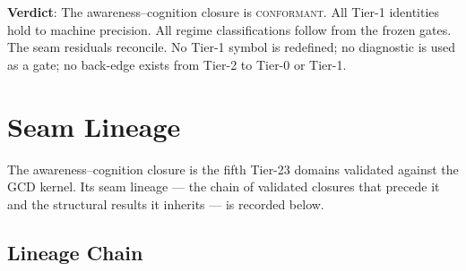 \documentclass[
  aps,
  prd,
  twocolumn,
  superscriptaddress,
  nofootinbib,
  floatfix
]{revtex4-2}
\begin{document}
\textbf{Verdict}: The awareness--cognition closure is
\textsc{conformant}.  All Tier-1 identities hold to
machine precision.  All regime classifications follow from
the frozen gates.  The seam residuals reconcile.  No
Tier-1 symbol is redefined; no diagnostic is used as a
gate; no back-edge exists from Tier-2 to Tier-0 or
Tier-1.

\section{Seam Lineage}\label{app:lineage}

The awareness--cognition closure is the fifth Tier-23 domains
validated against the GCD kernel.  Its seam lineage --- the
chain of validated closures that precede it and the
structural results it inherits --- is recorded below.

\subsection{Lineage Chain}
\end{document}
